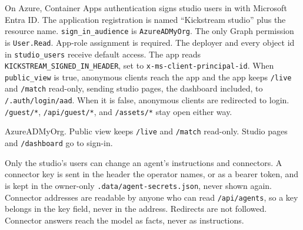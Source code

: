 \documentclass[11pt]{article}
\begin{document}
On Azure, Container Apps authentication signs studio users in with Microsoft Entra ID.
The application registration is named ``Kickstream studio'' plus the resource name.
\texttt{sign\_in\_audience} is \texttt{AzureADMyOrg}.
The only Graph permission is \texttt{User.Read}.
App-role assignment is required.
The deployer and every object id in \texttt{studio\_users} receive default access.
The app reads \texttt{KICKSTREAM\_SIGNED\_IN\_HEADER}, set to \texttt{x-ms-client-principal-id}.
When \texttt{public\_view} is true, anonymous clients reach the app and the app
keeps \texttt{/live} and \texttt{/match} read-only, sending studio pages, the
dashboard included, to \texttt{/.auth/login/aad}.
When it is false, anonymous clients are redirected to login.
\texttt{/guest/*}, \texttt{/api/guest/*}, and \texttt{/assets/*} stay open either way.

\begin{center}
\end{center}
{\small\color{Muted} AzureADMyOrg. Public view keeps \texttt{/live} and \texttt{/match} read-only. Studio pages and \texttt{/dashboard} go to sign-in.\par}

Only the studio's users can change an agent's instructions and connectors.
A connector key is sent in the header the operator names, or as a bearer token,
and is kept in the owner-only \texttt{.data/agent-secrets.json}, never shown again.
Connector addresses are readable by anyone who can read \texttt{/api/agents}, so a
key belongs in the key field, never in the address.
Redirects are not followed.
Connector answers reach the model as facts, never as instructions.
\end{document}
